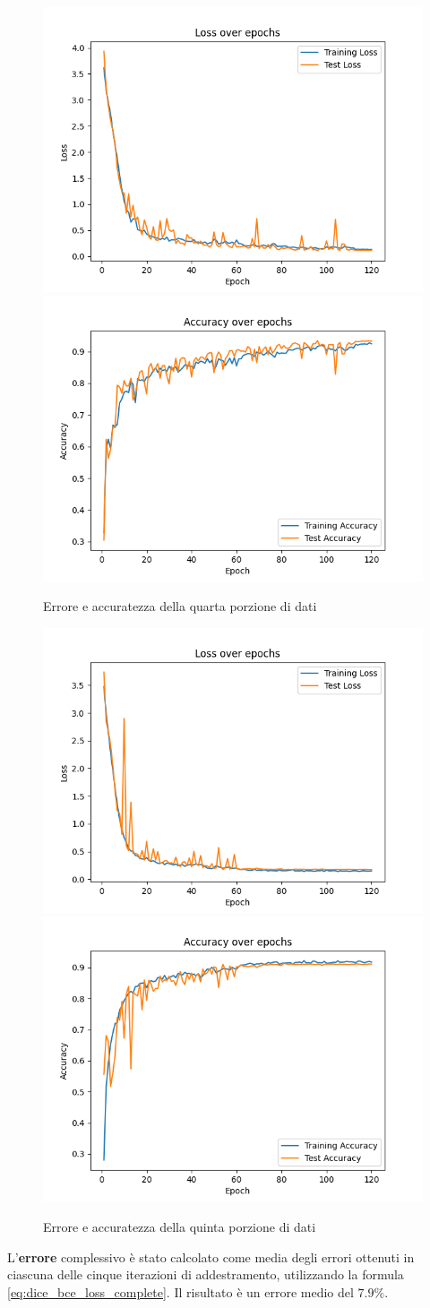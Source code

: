 \begin{figure}
	\centering
	\includegraphics[width=0.4\columnwidth]{Immagini/fold_3_loss.png} \includegraphics[width=0.4\columnwidth]{Immagini/fold_3_accuracy.png}
	\caption{Errore e accuratezza della quarta porzione di dati}
	\label{fig:loss e accuratezza della quarta porzione di dati}
\end{figure}

\begin{figure}
	\centering
	\includegraphics[width=0.4\columnwidth]{Immagini/fold_4_loss.png} \includegraphics[width=0.4\columnwidth]{Immagini/fold_4_accuracy.png}
	\caption{Errore e accuratezza della quinta porzione di dati}
	\label{fig:loss e accuratezza della quinta porzione di dati}
\end{figure}


L'\textbf{errore} complessivo è stato calcolato come media degli errori ottenuti in ciascuna delle
cinque iterazioni di addestramento, utilizzando la formula \ref{eq:dice_bce_loss_complete}. Il
risultato è un errore medio del \textbf{$7.9\%$}.

